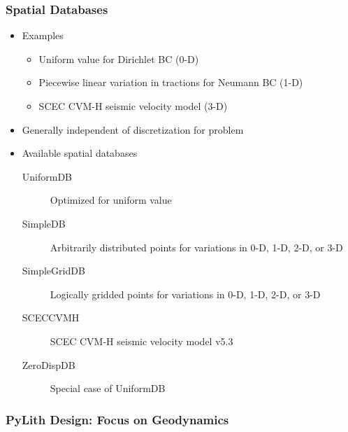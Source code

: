 \documentclass[aspectratio=169]{beamer}
\begin{document}
\begin{frame}
  \frametitle{Spatial Databases}

  \begin{itemize}
 \item Examples
    \begin{itemize}
    \item Uniform value for Dirichlet BC (0-D)
    \item Piecewise linear variation in tractions for Neumann BC (1-D)
    \item SCEC CVM-H seismic velocity model (3-D)
    \end{itemize}
  \item Generally independent of discretization for problem
  \item Available spatial databases
    \begin{description}
    \item[UniformDB] Optimized for uniform value
    \item[SimpleDB] Arbitrarily distributed points for variations in 0-D, 1-D, 2-D, or 3-D
    \item[SimpleGridDB] Logically gridded points for variations in 0-D, 1-D, 2-D, or 3-D
    \item[SCECCVMH] SCEC CVM-H seismic velocity model v5.3
    \item[ZeroDispDB] Special case of UniformDB
    \end{description}
 \end{itemize}

\end{frame}

\begin{frame}
  \frametitle{PyLith Design: Focus on Geodynamics}


\end{frame}
\end{document}
